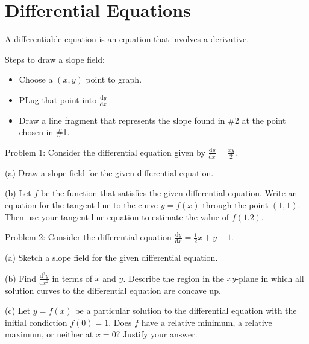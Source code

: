 \documentclass[../abcalc.tex]{subfiles}
\begin{document}
\chapter{Differential Equations}
A differentiable equation is an equation that involves a derivative.

Steps to draw a slope field:
\begin{itemize}
    \item Choose a $(x,y)$ point to graph.
    \item PLug that point into $\frac{\mathrm{d}y}{\mathrm{d}x}$
    \item Draw a line fragment that represents the slope found in \#2 at the point chosen in \#1.
\end{itemize}

Problem 1: Consider the differential equation given by $\frac{\mathrm{d}y}{\mathrm{d}x} = \frac{xy}{2}$.

(a) Draw a slope field for the given differential equation.

(b) Let $f$ be the function that satisfies the given differential equation. Write an equation for the tangent line to the curve $y=f(x)$ through the point $(1,1)$.
Then use your tangent line equation to estimate the value of $f(1.2)$.

Problem 2: Consider the differential equation $\frac{\mathrm{d}y}{\mathrm{d}x}=\frac{1}{2}x+y-1$.

(a) Sketch a slope field for the given differential equation.

(b) Find $\frac{\mathrm{d}^2y}{\mathrm{d}x^2}$ in terms of $x$ and $y$. Describe the region in the $xy$-plane in which all solution curves to the differential equation are concave up.

(c) Let $y=f(x)$ be a particular solution to the differential equation with the initial condiction $f(0)=1$. Does $f$ have a relative minimum, a relative maximum, or neither at $x=0$? Justify your answer.
\end{document}
